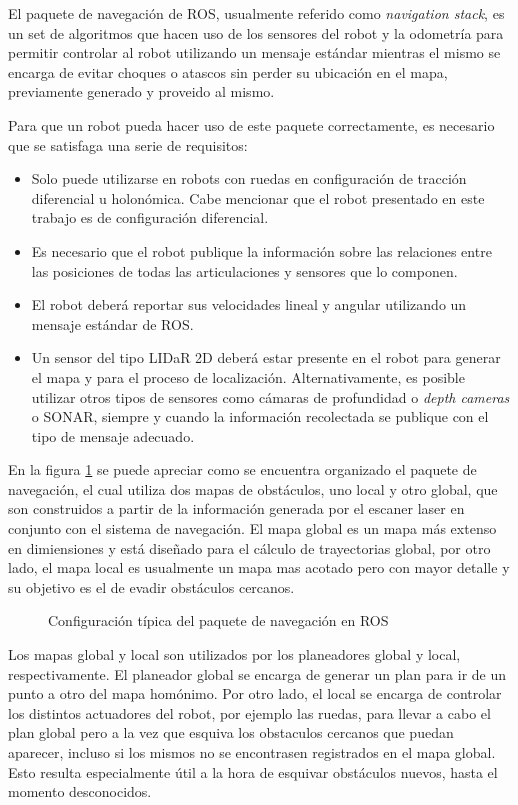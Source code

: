 El paquete de navegación de ROS, usualmente referido como \textit{navigation stack}, es un set de algoritmos que hacen uso de los sensores del robot y la odometría para permitir controlar al robot utilizando un mensaje estándar mientras el mismo se encarga de evitar choques o atascos sin perder su ubicación en el mapa, previamente generado y proveido al mismo.

Para que un robot pueda hacer uso de este paquete correctamente, es necesario que se satisfaga una serie de requisitos:
\begin{itemize}
    \item Solo puede utilizarse en robots con ruedas en configuración de tracción diferencial u holonómica. Cabe mencionar que el robot presentado en este trabajo es de configuración diferencial.
    \item Es necesario que el robot publique la información sobre las relaciones entre las posiciones de todas las articulaciones y sensores que lo componen.
    \item El robot deberá reportar sus velocidades lineal y angular utilizando un mensaje estándar de ROS.
    \item Un sensor del tipo LIDaR 2D deberá estar presente en el robot para generar el mapa y para el proceso de localización. Alternativamente, es posible utilizar otros tipos de sensores como cámaras de profundidad o \textit{depth cameras} o SONAR, siempre y cuando la información recolectada se publique con el tipo de mensaje adecuado.
\end{itemize}

En la figura \ref{fig:navigationStack} se puede apreciar como se encuentra organizado el paquete de navegación, el cual utiliza dos mapas de obstáculos, uno local y otro global, que son construidos a partir de la información generada por el escaner laser en conjunto con el sistema de navegación. El mapa global es un mapa más extenso en dimiensiones y está diseñado para el cálculo de trayectorias global, por otro lado, el mapa local es usualmente un mapa mas acotado pero con mayor detalle y su objetivo es el de evadir obstáculos cercanos.

\begin{figure}[ht]
    \centering
    \def\svgwidth{350pt}
    
    \caption{Configuración típica del paquete de navegación en ROS}
    \label{fig:navigationStack}
\end{figure}

Los mapas global y local son utilizados por los planeadores global y local, respectivamente. El planeador global se encarga de generar un plan para ir de un punto a otro del mapa homónimo. Por otro lado, el local se encarga de controlar los distintos actuadores del robot, por ejemplo las ruedas, para llevar a cabo el plan global pero a la vez que esquiva los obstaculos cercanos que puedan aparecer, incluso si los mismos no se encontrasen registrados en el mapa global. Esto resulta especialmente útil a la hora de esquivar obstáculos nuevos, hasta el momento desconocidos.


